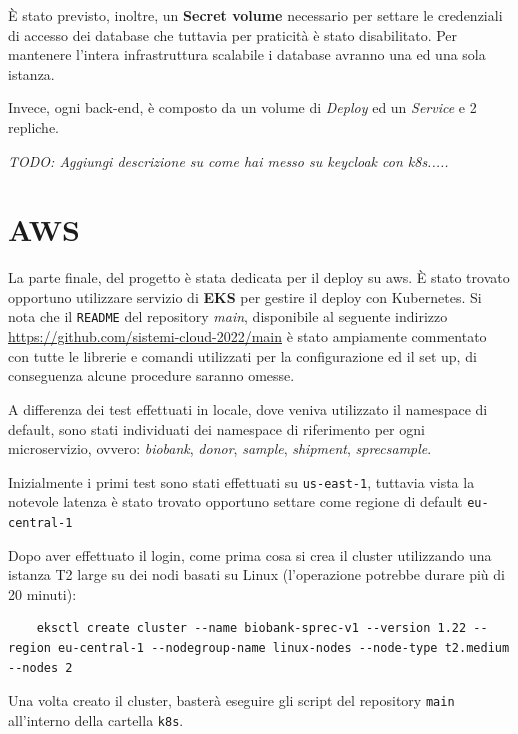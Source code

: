 \documentclass{article}
\begin{document}
È stato previsto, inoltre, un \textbf{Secret volume} necessario per settare le credenziali di accesso dei database che tuttavia per praticità è stato disabilitato. Per mantenere l'intera infrastruttura
scalabile i database avranno una ed una sola istanza.

Invece, ogni back-end, è composto da un volume di \textit{Deploy} ed un \textit{Service} e 2 repliche.

\textit{TODO: Aggiungi descrizione su come hai messo su keycloak con k8s.....}


\section{AWS}

La parte finale, del progetto è stata dedicata per il deploy su aws.
È stato trovato opportuno utilizzare servizio di \textbf{EKS} per gestire il deploy con Kubernetes. Si nota che il \texttt{README} del repository \textit{main},
disponibile al seguente indirizzo \href{https://github.com/sistemi-cloud-2022/main}{https://github.com/sistemi-cloud-2022/main}
è stato ampiamente commentato con tutte le librerie e comandi 
utilizzati per la configurazione ed il set up, di conseguenza alcune procedure saranno omesse.

A differenza dei test effettuati in locale, dove veniva utilizzato il namespace di default, sono stati individuati dei namespace di riferimento per ogni microservizio,
ovvero: \textit{biobank}, \textit{donor}, \textit{sample}, \textit{shipment}, \textit{sprecsample}.  

Inizialmente i primi test sono stati effettuati su \texttt{us-east-1}, tuttavia vista la notevole latenza è stato trovato opportuno settare come regione di default \texttt{eu-central-1}

Dopo aver effettuato il login, come prima cosa si crea il cluster utilizzando una istanza T2 large su dei nodi basati su Linux (l'operazione potrebbe durare più di 20 minuti):

\begin{verbatim}
    eksctl create cluster --name biobank-sprec-v1 --version 1.22 --region eu-central-1 --nodegroup-name linux-nodes --node-type t2.medium --nodes 2
\end{verbatim}

Una volta creato il cluster, basterà eseguire gli script del repository \texttt{main} all'interno della cartella \texttt{k8s}.
\end{document}
